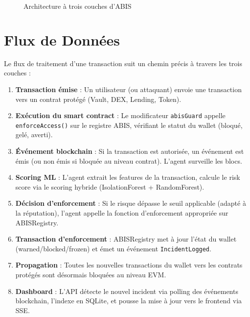 \documentclass[12pt,a4paper]{report}
\newcommand{\code}[1]{\texttt{#1}}
\begin{document}
\begin{figure}[H]
\caption{Architecture à trois couches d'ABIS}
\label{fig:architecture_globale}
\end{figure}

\section{Flux de Données}

Le flux de traitement d'une transaction suit un chemin précis à travers les trois couches :

\begin{enumerate}
  \item \textbf{Transaction émise} : Un utilisateur (ou attaquant) envoie une transaction vers un contrat protégé (Vault, DEX, Lending, Token).
  \item \textbf{Exécution du smart contract} : Le modificateur \code{abisGuard} appelle \code{enforceAccess()} sur le registre ABIS, vérifiant le statut du wallet (bloqué, gelé, averti).
  \item \textbf{Événement blockchain} : Si la transaction est autorisée, un événement est émis (ou non émis si bloquée au niveau contrat). L'agent surveille les blocs.
  \item \textbf{Scoring ML} : L'agent extrait les features de la transaction, calcule le risk score via le scoring hybride (IsolationForest + RandomForest).
  \item \textbf{Décision d'enforcement} : Si le risque dépasse le seuil applicable (adapté à la réputation), l'agent appelle la fonction d'enforcement appropriée sur ABISRegistry.
  \item \textbf{Transaction d'enforcement} : ABISRegistry met à jour l'état du wallet (warned/blocked/frozen) et émet un événement \code{IncidentLogged}.
  \item \textbf{Propagation} : Toutes les nouvelles transactions du wallet vers les contrats protégés sont désormais bloquées au niveau EVM.
  \item \textbf{Dashboard} : L'API détecte le nouvel incident via polling des événements blockchain, l'indexe en SQLite, et pousse la mise à jour vers le frontend via SSE.
\end{enumerate}
\end{document}
